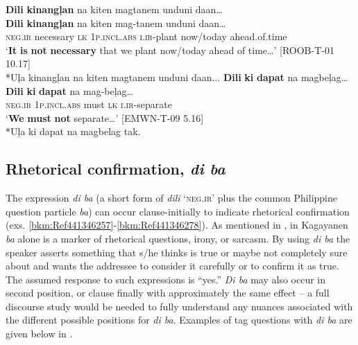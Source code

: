 \ea
\textbf{Dili}  \textbf{kinangļan}  na  kiten  magtanem  unduni  daan… \\\smallskip
\gll \textbf{Dili}  \textbf{kinangļan}  na  kiten  mag-tanem  unduni  daan… \\
\textsc{neg.ir}  necessary  \textsc{lk} 1\textsc{p.incl.abs}  \textsc{i.ir}-plant  now/today  ahead.of.time \\
\glt ‘\textbf{It} \textbf{is} \textbf{not} \textbf{necessary} that we plant now/today ahead of time…’ [ROOB-T-01 10.17] \\\smallskip
*Uļa kinangļan na kiten magtanem unduni daan...
\z
\ea
\textbf{Dili}  \textbf{ki}  \textbf{dapat}  na  magbeļag… \\\smallskip
\gll \textbf{Dili}  \textbf{ki}  \textbf{dapat}  na  mag-beļag… \\
\textsc{neg.ir}  1\textsc{p.incl.abs}  must  \textsc{lk}  \textsc{i.ir}-separate \\
\glt `\textbf{We} \textbf{must} \textbf{not} separate…’ [EMWN-T-09 5.16] \\\smallskip
*Uļa ki dapat na magbelag tak.
\z
\subsection{Rhetorical confirmation, \textit{di ba}}
\label{bkm:Ref113630514}\label{sec:rhetoricalconfirmation} 
The expression \textit{di ba} (a short form of \textit{dili} ‘\textsc{neg.ir’} plus the common Philippine question particle \textit{ba}) can occur clause-initially to indicate rhetorical confirmation (exs. \ref{bkm:Ref441346257}{}-\ref{bkm:Ref441346278}). As mentioned in , in Kagayanen \textit{ba} alone is a marker of rhetorical questions, irony, or sarcasm. By using \textit{di ba} the speaker asserts something that s/he thinks is true or maybe not completely sure about and wants the addressee to consider it carefully or to confirm it as true. The assumed response to such expressions is “yes.” \textit{Di ba} may also occur in second position, or clause finally with approximately the same effect – a full discourse study would be needed to fully understand any nuances associated with the different possible positions for \textit{di ba}. Examples of tag questions with \textit{di ba} are given below in .

